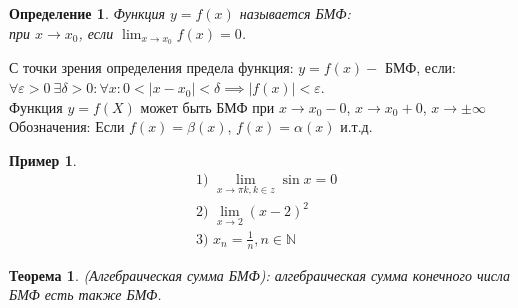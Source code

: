 \documentclass[12pt, a4paper]{article}
\newtheorem{theorem}{Теорема}[subsection]
\newtheorem{definition}{Определение}[subsection]
\newtheorem{example}{Пример}[subsection]
\theoremstyle{remark}
\newcommand{\N}{\mathbb{N}}
\newcommand{\Y}{\mathbb{\forall}}
\newcommand{\F}{\mathbb{\exists}}
\newcommand{\E}{\mathbb{\varepsilon}}
\begin{document}
	\begin{definition}
		Функция $y = f(x)$ называется БМФ: \\ при $x \to x_0$, если \(\lim_{x \to x_0} f(x) = 0\). 
	\end{definition}
	
	\noindent С точки зрения определения предела функция: $y = f(x) -$ БМФ, если: \\ $\Y\E > 0 \ \F\delta > 0: \Y x: 0 < |x - x_0| < \delta \implies |f(x)| < \E$.
	\\
	
	\noindent Функция $y = f(X)$ может быть БМФ при $x \to x_0 - 0$, $x \to x_0 + 0$, $x \to \pm\infty$
	\\ 
	
	\noindent Обозначения: Если $f(x) = \beta(x)$, $f(x) = \alpha(x)$ и.т.д.
	
	\begin{example}
		\begin{align*}
			&\text{1) } \lim_{x \to \pi k, k \in z} \sin x = 0 \\
			&\text{2) } \lim_{x \to 2} (x - 2)^2 \\
			&\text{3) } x_n = \frac{1}{n}, n \in \N
		\end{align*}
	\end{example}
	
	\begin{theorem}
		(Алгебраическая сумма БМФ): алгебраическая сумма конечного числа БМФ есть также БМФ.	
	\end{theorem}
	
\end{document}
